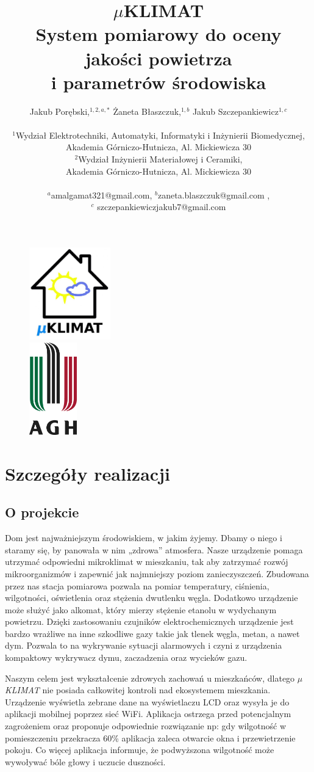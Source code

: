 \documentclass[12pt,a4paper]{article}
\author
{Jakub Porębski,$^{1,2,a,\ast}$ Żaneta Błaszczuk,$^{1,b}$ Jakub Szczepankiewicz$^{1, c}$\\
\\
\normalsize{$^{1}$Wydział Elektrotechniki, Automatyki, Informatyki i Inżynierii Biomedycznej,}\\
\normalsize{Akademia Górniczo-Hutnicza, Al. Mickiewicza 30}\\
\normalsize{$^{2}$Wydział Inżynierii Materiałowej i Ceramiki,}\\ \normalsize{Akademia Górniczo-Hutnicza, Al. Mickiewicza 30}\\
\\
\normalsize{$^a$amalgamat321@gmail.com, $^b$zaneta.blaszczuk@gmail.com ,}\\
\normalsize{$^c$ szczepankiewiczjakub7@gmail.com}
}
\title{\Huge{$\mu$KLIMAT}\\\Large{System pomiarowy do oceny jakości powietrza \\i parametrów środowiska}}
\date{}
\begin{document}
%
\maketitle
\begin{figure}[!h]
\centering
	\includegraphics[height =40mm]{logo.jpg}\\[1cm]
	\includegraphics[height =40mm]{agh.jpg}
\end{figure}
\newpage


\section{Szczegóły realizacji}

\subsection{O projekcie}
Dom jest najważniejszym środowiskiem, w jakim żyjemy. Dbamy o niego i staramy się, by panowała w nim „zdrowa” atmosfera. Nasze urządzenie pomaga utrzymać odpowiedni mikroklimat w mieszkaniu, tak aby zatrzymać rozwój mikroorganizmów i zapewnić jak najmniejszy poziom zanieczyszczeń. Zbudowana przez nas stacja pomiarowa pozwala na pomiar temperatury, ciśnienia, wilgotności, oświetlenia oraz stężenia dwutlenku węgla. Dodatkowo urządzenie może służyć jako alkomat, który mierzy stężenie etanolu w wydychanym powietrzu. Dzięki zastosowaniu czujników elektrochemicznych urządzenie jest bardzo wrażliwe na inne szkodliwe gazy takie jak tlenek węgla, metan, a nawet dym. Pozwala to na wykrywanie sytuacji alarmowych i czyni z urządzenia kompaktowy wykrywacz dymu, zaczadzenia oraz wycieków gazu.

Naszym celem jest wykształcenie zdrowych zachowań u mieszkańców, dlatego \textit{$\mu$KLIMAT} nie posiada całkowitej kontroli nad ekosystemem mieszkania. Urządzenie wyświetla zebrane dane na wyświetlaczu LCD oraz wysyła je do aplikacji mobilnej poprzez sieć WiFi. Aplikacja ostrzega przed potencjalnym zagrożeniem oraz proponuje odpowiednie rozwiązanie np: gdy wilgotność w pomieszczeniu przekracza 60\% aplikacja zaleca otwarcie okna i przewietrzenie pokoju. Co więcej aplikacja informuje, że podwyższona wilgotność może wywoływać bóle głowy i uczucie duszności. 
\end{document}

